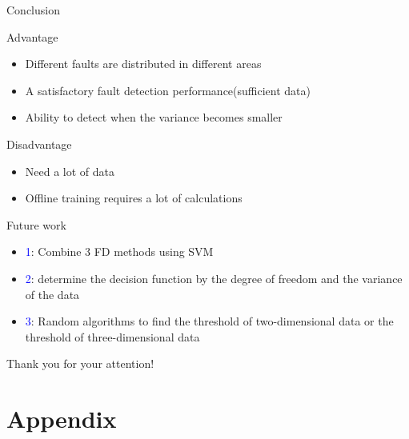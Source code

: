 \documentclass[10pt]{beamer}
\begin{document}
\begin{frame}{Conclusion}
    \begin{exampleblock}{Advantage}
	\begin{itemize}
    \item Different faults are distributed in different areas
    \item A satisfactory fault detection performance(sufficient data)
    \item Ability to detect when the variance becomes smaller
    \end{itemize}
    \end{exampleblock}
    
    \begin{exampleblock}{Disadvantage}
	\begin{itemize}
    \item Need a lot of data
    \item Offline training requires a lot of calculations
    \end{itemize}
    \end{exampleblock}
\end{frame}
\begin{frame}{Future work}
      \begin{itemize}
      \item \textcolor{blue}{1}: Combine 3 FD methods using SVM
        \item \textcolor{blue}{2}: determine the decision function by the degree of freedom and the variance of the data
      \item \textcolor{blue}{3}: Random algorithms to find the threshold of two-dimensional data or the threshold of three-dimensional data
 	 \end{itemize}  
\end{frame}

\begin{frame}[standout]
\begin{center}
Thank you for your attention!
\end{center}
\end{frame}

\section{Appendix}
\end{document}
